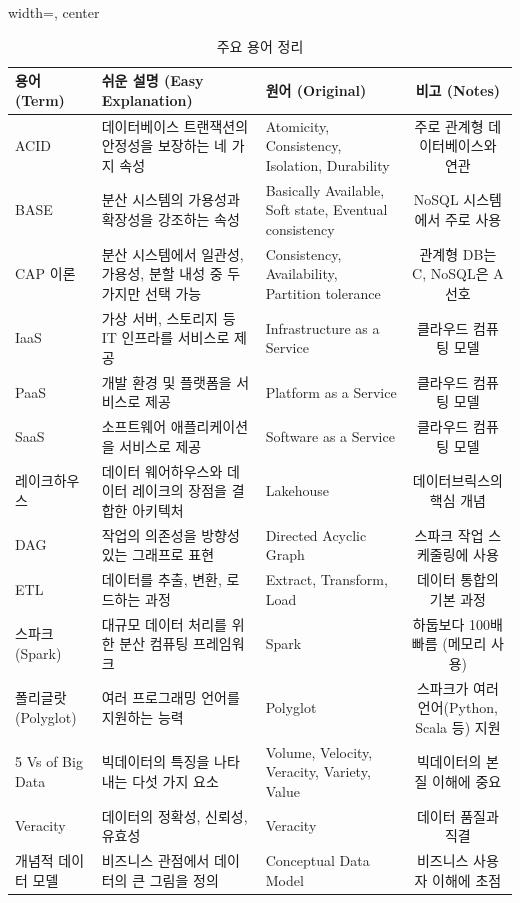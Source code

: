 \documentclass[11pt,a4paper]{article}
\theoremstyle{definition}
\begin{document}
\begin{table}[h!]
\centering
\caption{주요 용어 정리}
\label{tab:glossary}
\begin{adjustbox}{width=\textwidth, center}
\begin{tabular}{lllc}
\toprule
\textbf{용어 (Term)} & \textbf{쉬운 설명 (Easy Explanation)} & \textbf{원어 (Original)} & \textbf{비고 (Notes)} \\
\midrule
ACID & 데이터베이스 트랜잭션의 안정성을 보장하는 네 가지 속성 & Atomicity, Consistency, Isolation, Durability & 주로 관계형 데이터베이스와 연관 \\
BASE & 분산 시스템의 가용성과 확장성을 강조하는 속성 & Basically Available, Soft state, Eventual consistency & NoSQL 시스템에서 주로 사용 \\
CAP 이론 & 분산 시스템에서 일관성, 가용성, 분할 내성 중 두 가지만 선택 가능 & Consistency, Availability, Partition tolerance & 관계형 DB는 C, NoSQL은 A 선호 \\
IaaS & 가상 서버, 스토리지 등 IT 인프라를 서비스로 제공 & Infrastructure as a Service & 클라우드 컴퓨팅 모델 \\
PaaS & 개발 환경 및 플랫폼을 서비스로 제공 & Platform as a Service & 클라우드 컴퓨팅 모델 \\
SaaS & 소프트웨어 애플리케이션을 서비스로 제공 & Software as a Service & 클라우드 컴퓨팅 모델 \\
레이크하우스 & 데이터 웨어하우스와 데이터 레이크의 장점을 결합한 아키텍처 & Lakehouse & 데이터브릭스의 핵심 개념 \\
DAG & 작업의 의존성을 방향성 있는 그래프로 표현 & Directed Acyclic Graph & 스파크 작업 스케줄링에 사용 \\
ETL & 데이터를 추출, 변환, 로드하는 과정 & Extract, Transform, Load & 데이터 통합의 기본 과정 \\
스파크 (Spark) & 대규모 데이터 처리를 위한 분산 컴퓨팅 프레임워크 & Spark & 하둡보다 100배 빠름 (메모리 사용) \\
폴리글랏 (Polyglot) & 여러 프로그래밍 언어를 지원하는 능력 & Polyglot & 스파크가 여러 언어(Python, Scala 등) 지원 \\
5 Vs of Big Data & 빅데이터의 특징을 나타내는 다섯 가지 요소 & Volume, Velocity, Veracity, Variety, Value & 빅데이터의 본질 이해에 중요 \\
Veracity & 데이터의 정확성, 신뢰성, 유효성 & Veracity & 데이터 품질과 직결 \\
개념적 데이터 모델 & 비즈니스 관점에서 데이터의 큰 그림을 정의 & Conceptual Data Model & 비즈니스 사용자 이해에 초점 \\

\end{tabular}
\end{adjustbox}
\end{table}
\end{document}
